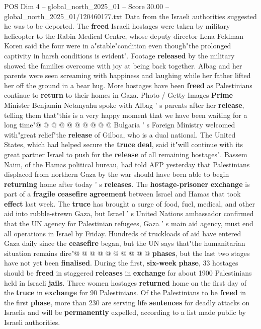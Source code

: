 \begin{textsample}{POS Dim 4 – global\_north\_2025\_01 – Score 30.00 – global\_north\_2025\_01/120460177.txt}
Data from the Israeli authorities suggested he was to be deported.
The \textbf{freed} Israeli hostages were taken by military helicopter to the Rabin Medical Centre, whose deputy director Lena Feldman Koren said the four were in a"stable"condition even though"the prolonged captivity in harsh conditions is evident".
Footage \textbf{released} by the military showed the families overcome with joy at being back together.
Albag and her parents were seen screaming with happiness and laughing while her father lifted her off the ground in a bear hug.
More hostages have been \textbf{freed} as Palestinians continue to \textbf{return} to their homes in Gaza.
Photo / Getty Images \textbf{Prime} Minister Benjamin Netanyahu spoke with Albag ' s parents after her \textbf{release}, telling them that"this is a very happy moment that we have been waiting for a long time"@ @ @ @ @ @ @ @ @ @ Bulgaria ' s Foreign Ministry welcomed with"great relief"the \textbf{release} of Gilboa, who is a dual national.
The United States, which had helped secure the \textbf{truce} \textbf{deal}, said it"will continue with its great partner Israel to push for the \textbf{release} of all remaining hostages".
Bassem Naim, of the Hamas political bureau, had told AFP yesterday that Palestinians displaced from northern Gaza by the war should have been able to begin \textbf{returning} home after today ' s \textbf{releases}.
The \textbf{hostage-prisoner} \textbf{exchange} is part of a \textbf{fragile} \textbf{ceasefire} \textbf{agreement} between Israel and Hamas that took \textbf{effect} last week.
The \textbf{truce} has brought a surge of food, fuel, medical, and other aid into rubble-strewn Gaza, but Israel ' s United Nations ambassador confirmed that the UN agency for Palestinian refugees, Gaza ' s main aid agency, must end all operations in Israel by Friday.
Hundreds of truckloads of aid have entered Gaza daily since the \textbf{ceasefire} began, but the UN says that"the humanitarian situation remains dire"@ @ @ @ @ @ @ @ @ @ \textbf{phases}, but the last two stages have not yet been \textbf{finalised}.
During the first, \textbf{six-week} \textbf{phase}, 33 hostages should be \textbf{freed} in staggered \textbf{releases} in \textbf{exchange} for about 1900 Palestinians held in Israeli \textbf{jails}.
Three women hostages \textbf{returned} home on the first day of the \textbf{truce} in \textbf{exchange} for 90 Palestinians.
Of the Palestinians to be \textbf{freed} in the first \textbf{phase}, more than 230 are serving life \textbf{sentences} for deadly attacks on Israelis and will be \textbf{permanently} expelled, according to a list made public by Israeli authorities.

\end{textsample}
